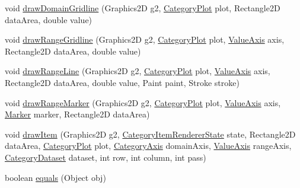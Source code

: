 \begin{DoxyCompactItemize}
\item 
void \mbox{\hyperlink{classorg_1_1jfree_1_1chart_1_1renderer_1_1category_1_1_bar_renderer3_d_ada41dc6bb04f7720aacc3bcafb9e5537}{draw\+Domain\+Gridline}} (Graphics2D g2, \mbox{\hyperlink{classorg_1_1jfree_1_1chart_1_1plot_1_1_category_plot}{Category\+Plot}} plot, Rectangle2D data\+Area, double value)
\item 
void \mbox{\hyperlink{classorg_1_1jfree_1_1chart_1_1renderer_1_1category_1_1_bar_renderer3_d_a97ecf7ab62332a7798f9164b17c0970a}{draw\+Range\+Gridline}} (Graphics2D g2, \mbox{\hyperlink{classorg_1_1jfree_1_1chart_1_1plot_1_1_category_plot}{Category\+Plot}} plot, \mbox{\hyperlink{classorg_1_1jfree_1_1chart_1_1axis_1_1_value_axis}{Value\+Axis}} axis, Rectangle2D data\+Area, double value)
\item 
void \mbox{\hyperlink{classorg_1_1jfree_1_1chart_1_1renderer_1_1category_1_1_bar_renderer3_d_a1b8f7a30d94b78d788523cb04be8f03c}{draw\+Range\+Line}} (Graphics2D g2, \mbox{\hyperlink{classorg_1_1jfree_1_1chart_1_1plot_1_1_category_plot}{Category\+Plot}} plot, \mbox{\hyperlink{classorg_1_1jfree_1_1chart_1_1axis_1_1_value_axis}{Value\+Axis}} axis, Rectangle2D data\+Area, double value, Paint paint, Stroke stroke)
\item 
void \mbox{\hyperlink{classorg_1_1jfree_1_1chart_1_1renderer_1_1category_1_1_bar_renderer3_d_ade56abd118ea6afec3806229275124d5}{draw\+Range\+Marker}} (Graphics2D g2, \mbox{\hyperlink{classorg_1_1jfree_1_1chart_1_1plot_1_1_category_plot}{Category\+Plot}} plot, \mbox{\hyperlink{classorg_1_1jfree_1_1chart_1_1axis_1_1_value_axis}{Value\+Axis}} axis, \mbox{\hyperlink{classorg_1_1jfree_1_1chart_1_1plot_1_1_marker}{Marker}} marker, Rectangle2D data\+Area)
\item 
void \mbox{\hyperlink{classorg_1_1jfree_1_1chart_1_1renderer_1_1category_1_1_bar_renderer3_d_a4e4d5db9f29dbfd50b1a55bb71127415}{draw\+Item}} (Graphics2D g2, \mbox{\hyperlink{classorg_1_1jfree_1_1chart_1_1renderer_1_1category_1_1_category_item_renderer_state}{Category\+Item\+Renderer\+State}} state, Rectangle2D data\+Area, \mbox{\hyperlink{classorg_1_1jfree_1_1chart_1_1plot_1_1_category_plot}{Category\+Plot}} plot, \mbox{\hyperlink{classorg_1_1jfree_1_1chart_1_1axis_1_1_category_axis}{Category\+Axis}} domain\+Axis, \mbox{\hyperlink{classorg_1_1jfree_1_1chart_1_1axis_1_1_value_axis}{Value\+Axis}} range\+Axis, \mbox{\hyperlink{interfaceorg_1_1jfree_1_1data_1_1category_1_1_category_dataset}{Category\+Dataset}} dataset, int row, int column, int pass)
\item 
boolean \mbox{\hyperlink{classorg_1_1jfree_1_1chart_1_1renderer_1_1category_1_1_bar_renderer3_d_a6749b80a0a63f48f9fd0b1adfa2bd6f7}{equals}} (Object obj)
\end{DoxyCompactItemize}
